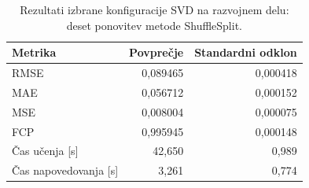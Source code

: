 \begin{table}[htbp]
\centering
\caption{Rezultati izbrane konfiguracije SVD na razvojnem delu:
deset ponovitev metode ShuffleSplit.}
\label{tab:cv_results_tuned_svd}
\begin{tabular}{lrr}
\toprule
Metrika & Povprečje & Standardni odklon \\
\midrule
RMSE & 0,089465 & 0,000418 \\
MAE & 0,056712 & 0,000152 \\
MSE & 0,008004 & 0,000075 \\
FCP & 0,995945 & 0,000148 \\
Čas učenja [s] & 42,650 & 0,989 \\
Čas napovedovanja [s] & 3,261 & 0,774 \\
\bottomrule
\end{tabular}
\end{table}